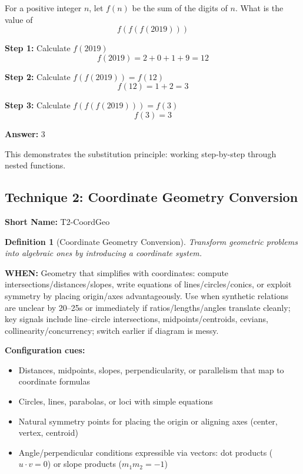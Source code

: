 \documentclass[12pt]{article}
\newtheorem{definition}{Definition}[section]
\newenvironment{problem}[1]
{\begin{tcolorbox}[colback=blue!5!white,colframe=blue!75!black,title={#1}]}{\end{tcolorbox}}
\newenvironment{solution}
{\begin{tcolorbox}[colback=green!5!white,colframe=green!75!black,title={Solution}]}{\end{tcolorbox}}
\begin{document}
\begin{problem}{AMC 12A 2019, Problem 7}
For a positive integer $n$, let $f(n)$ be the sum of the digits of $n$. What is the value of 
$$f(f(f(2019)))$$
\end{problem}

\begin{solution}
\textbf{Step 1:} Calculate $f(2019)$
$$f(2019) = 2 + 0 + 1 + 9 = 12$$

\textbf{Step 2:} Calculate $f(f(2019)) = f(12)$
$$f(12) = 1 + 2 = 3$$

\textbf{Step 3:} Calculate $f(f(f(2019))) = f(3)$
$$f(3) = 3$$

\textbf{Answer:} $3$

This demonstrates the substitution principle: working step-by-step through nested functions.
\end{solution}

\subsection{Technique 2: Coordinate Geometry Conversion}
\textbf{Short Name:} T2-CoordGeo

\begin{definition}[Coordinate Geometry Conversion]
Transform geometric problems into algebraic ones by introducing a coordinate system.
\end{definition}

\textbf{WHEN:} Geometry that simplifies with coordinates: compute intersections/distances/slopes, write equations of lines/circles/conics, or exploit symmetry by placing origin/axes advantageously. Use when synthetic relations are unclear by 20--25s or immediately if ratios/lengths/angles translate cleanly; key signals include line–circle intersections, midpoints/centroids, cevians, collinearity/concurrency; switch earlier if diagram is messy.

\textbf{Configuration cues:}
\begin{itemize}
    \item Distances, midpoints, slopes, perpendicularity, or parallelism that map to coordinate formulas
    \item Circles, lines, parabolas, or loci with simple equations
    \item Natural symmetry points for placing the origin or aligning axes (center, vertex, centroid)
    \item Angle/perpendicular conditions expressible via vectors: dot products ($u\cdot v=0$) or slope products ($m_1 m_2=-1$)
\end{itemize}
\end{document}
